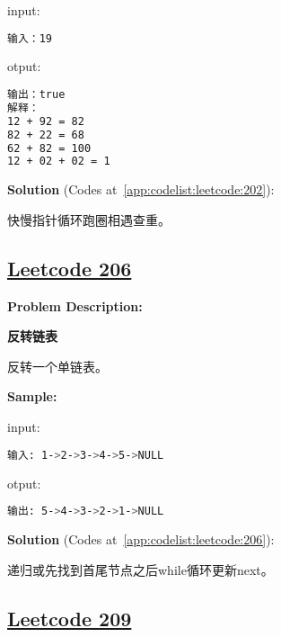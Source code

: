 input:\par

\begin{lstlisting}[language=bash]
输入：19
\end{lstlisting}

otput:\par

\begin{lstlisting}[language=bash]
输出：true
解释：
12 + 92 = 82
82 + 22 = 68
62 + 82 = 100
12 + 02 + 02 = 1
\end{lstlisting}

\textbf{Solution }(Codes at~\ref{app:codelist:leetcode:202}):\par

快慢指针循环跑圈相遇查重。\par



\subsection{\href{https://leetcode-cn.com/}{Leetcode 206}}\label{app:problemlist:leetcode:206}

\textbf{Problem Description:}\par

\textbf{反转链表}\par

反转一个单链表。\par


\textbf{Sample:}\par

input:\par

\begin{lstlisting}[language=bash]
输入: 1->2->3->4->5->NULL
\end{lstlisting}

otput:\par

\begin{lstlisting}[language=bash]
输出: 5->4->3->2->1->NULL
\end{lstlisting}

\textbf{Solution }(Codes at~\ref{app:codelist:leetcode:206}):\par

递归或先找到首尾节点之后while循环更新next。\par



\subsection{\href{https://leetcode-cn.com/}{Leetcode 209}}\label{app:problemlist:leetcode:209}

